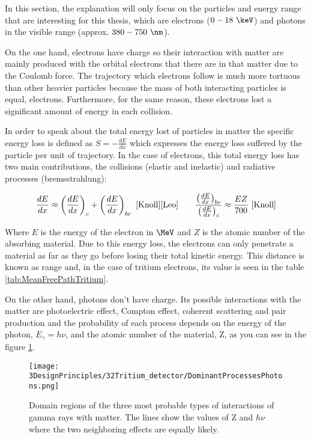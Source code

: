 In this section, the explanation will only focus on the particles and energy range that are interesting for this thesis, which are electrons ($0-18~\keV$) and photons in the visible range (approx. $380-750~\nm$).

On the one hand, electrons have charge so their interaction with matter are mainly produced with the orbital electrons that there are in that matter due to the Coulomb force. The trajectory which electrons follow is much more tortuous than other heavier particles because the mass of both interacting particles is equal, electrons. Furthermore, for the same reason, these electrons lost a significant amount of energy in each collision.

In order to speak about the total energy lost of particles in matter the specific energy loss is defined as $S=-\frac{dE}{dx}$ which expresses the energy loss suffered by the particle per unit of trajectory. In the case of electrons, this total energy loss has two main contributions, the collisions (elastic and inelastic) and radiative processes (bremsstrahlung):

\begin{equation}
\frac{dE}{dx} \approx \left(\frac{dE}{dx}\right)_{c} + \left(\frac{dE}{dx}\right)_{br} ~\cite{Knoll} \cite{Leo} \qquad  \frac{\left(\frac{dE}{dx}\right)_{br}}{\left(\frac{dE}{dx}\right)_{c}} \approx \frac{EZ}{700} ~\cite{Knoll}
\label{eq:ElectronInteraction}
\end{equation}

Where $E$ is the energy of the electron in $\MeV$ and $Z$ is the atomic number of the absorbing material. Due to this energy loss, the electrons can only penetrate a material as far as they go before losing their total kinetic energy. This distance is known as range and, in the case of tritium electrons, its value is seen in the table \ref{tab:MeanFreePathTritium}.

On the other hand, photons don't have charge. Its possible interactions with the matter are photoelectric effect, Compton effect, coherent scattering and pair production and the probability of each process depends on the energy of the photon, $E_\gamma = h\nu$, and the atomic number of the material, Z, as you can see in the figure \ref{fig:ProcessesPhotons}.

\begin{figure}[htbp]
\centering
\texttt{[image: 3DesignPrinciples/32Tritium\_detector/DominantProcessesPhotons.png]}
\caption{Domain regions of the three most probable types of interactions of gamma rays with matter. The lines show the values of Z and $h\nu$ where the two neighboring effects are equally likely.\label{fig:ProcessesPhotons}~\cite{Knoll}~\cite{Leo}}
\end{figure}

